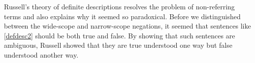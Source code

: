 Russell's theory of definite descriptions resolves the problem of non-referring terms and also explains why it seemed so paradoxical. Before we distinguished between the wide-scope and narrow-scope negations, it seemed that sentences like \ref{defdesc2} should be both true and false. By showing that such sentences are ambiguous, Russell showed that they are true understood one way but false understood another way.



\practiceproblems
\setlength{\parindent}{0em}






